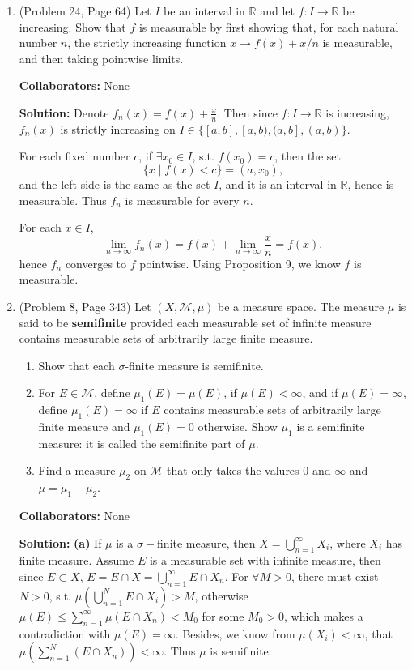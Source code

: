 \documentclass{article}%
\begin{document}
\begin{enumerate}
\item  (Problem 24, Page 64) Let $I$ be an interval in $\mathbb{R}$ and let $f:I\to \mathbb{R}$ be increasing. Show that $f$ is measurable by first showing that, for each natural number $n$, the strictly increasing function $x\to f(x)+x/n$ is measurable, and then taking pointwise limits.


\bigskip
\textbf{Collaborators:} None
\smallskip
 
\textbf{Solution:}
Denote $f_{n}(x) = f(x)+\frac{x}{n}$. Then since $f: I \to \mathbb{R}$ is increasing, $f_n(x)$ is strictly increasing on $I \in \{[a, b], [a, b), (a, b], (a, b)\}$.

For each fixed number $c$, if $\exists x_0\in I$, s.t. $f(x_0) = c$, then the set
$$
\{x\mid f(x) < c\} = (a, x_0),
$$
and the left side is the same as the set $I$, and it is an interval in $\mathbb{R}$, hence is measurable. Thus $f_{n}$ is measurable for every $n$. 

For each $x\in I$, 
$$
\lim_{n\to\infty}f_n(x) = f(x)+\lim_{n\to\infty}\frac{x}{n} = f(x),
$$
hence $f_{n}$ converges to $f$ pointwise. Using Proposition 9, we know $f$ is measurable.
\bigskip

\item (Problem 8, Page 343)  Let $(X,\mathcal{M}, \mu)$ be a measure space.  The measure $\mu$ is said to be \textbf{semifinite} provided each measurable set of infinite measure contains measurable sets of arbitrarily large finite measure.
\begin{enumerate}
\item Show that each $\sigma$-finite measure is semifinite.
\item For $E\in \mathcal{M}$, define $\mu_1(E) = \mu(E)$, if $\mu(E)<\infty$, and if $\mu(E)=\infty$, define $\mu_1(E)=\infty$ if $E$ contains measurable sets of arbitrarily large finite measure and $\mu_1(E)= 0$ otherwise.  Show $\mu_1$ is a semifinite measure: it is called the semifinite part of $\mu$.
\item Find a measure $\mu_2$ on $\mathcal{M}$ that only takes the valures $0$ and $\infty$ and $\mu = \mu_1 + \mu_2$.
\end{enumerate} 


\bigskip
\textbf{Collaborators:} None
\smallskip
 
\textbf{Solution:}
\textbf{(a)} If $\mu$ is a $\sigma-$finite measure, then $X = \bigcup\limits_{n=1}^{\infty} X_i$, where $X_i$ has finite measure. Assume $E$ is a measurable set with infinite measure, then since $E\subset X$, $E = E\cap X = \bigcup\limits_{n=1}^{\infty} E\cap X_n$. For $\forall M > 0$, there must exist $N > 0$, s.t. $\mu\left(\bigcup\limits_{n=1}^{N}E\cap X_i\right) > M$, otherwise $\mu(E) \le \sum\limits_{n=1}^{\infty}\mu(E\cap X_n) < M_0$ for some $M_0 > 0$, which makes a contradiction with $\mu(E) = \infty$. Besides, we know from $\mu(X_i) < \infty$, that $\mu\left(\sum\limits_{n=1}^{N}(E\cap X_n)\right) < \infty$. Thus $\mu$ is semifinite.


\end{enumerate}
\end{document}
